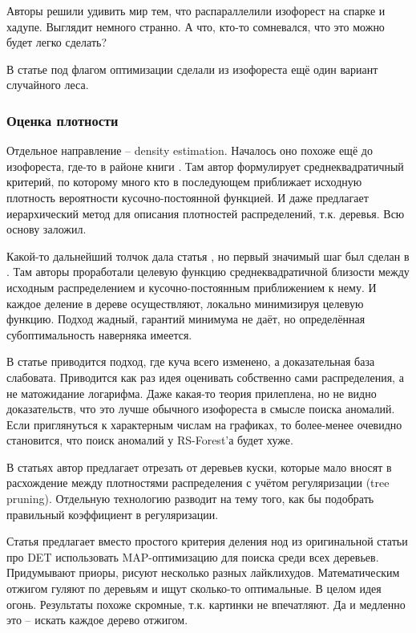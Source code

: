 \documentclass[12pt]{article}
\begin{document}
Авторы
\cite{taoParallelAlgorithmNetwork2018} 
решили удивить мир тем, что распараллелили изофорест на спарке и хадупе. Выглядит немного
странно. А что, кто-то сомневался, что это можно будет легко сделать?

В статье
\cite{liuOptimizedComputationalFramework2018}
под флагом оптимизации сделали из изофореста ещё один вариант случайного леса.

\subsubsection*{Оценка плотности}

Отдельное направление -- density estimation. Началось оно похоже ещё до изофореста, где-то
в районе книги
\cite{silvermanDensityEstimationStatistics1986}
. Там автор формулирует среднеквадратичный критерий, по которому много кто в последующем
приближает исходную плотность вероятности кусочно-постоянной функцией. И даже предлагает
иерархический метод для описания плотностей распределений, т.к. деревья.
Всю основу заложил.

Какой-то дальнейший толчок дала статья
\cite{hookerDiagnosingExtrapolationTreebased2004a}
, но первый значимый шаг был сделан в
\cite{ramDensityEstimationTrees2011}
. Там авторы проработали целевую функцию среднеквадратичной близости
между исходным распределением и кусочно-постоянным приближением к нему. И каждое деление
в дереве осуществляют, локально минимизируя целевую функцию. Подход жадный, гарантий минимума
не даёт, но определённая субоптимальность наверняка имеется.

В статье
\cite{wuRSForestRapidDensity2014}
приводится подход, где куча всего изменено, а доказательная база слабовата.
Приводится как раз идея оценивать собственно сами распределения, а не матожидание
логарифма. Даже какая-то теория прилеплена, но не видно доказательств, что это
лучше обычного изофореста в смысле поиска аномалий. Если приглянуться к характерным
числам на графиках, то более-менее очевидно становится, что поиск аномалий у RS-Forest'а
будет хуже.

В статьях
\cite{anderliniDensityEstimationTrees2015}
\cite{anderliniDensityEstimationTrees2016}
автор предлагает отрезать от деревьев куски, которые мало вносят в расхождение между
плотностями распределения с учётом регуляризации (tree pruning). Отдельную технологию разводит
на тему того, как бы подобрать правильный коэффициент в регуляризации.

Статья
\cite{gohCascadedHighDimensional2016}
предлагает вместо простого критерия деления нод из оригинальной статьи про DET использовать 
MAP-оптимизацию для поиска среди всех деревьев.
Придумывают приоры, рисуют несколько разных лайклихудов. Математическим отжигом гуляют по
деревьям и ищут сколько-то оптимальные. В целом идея огонь. Результаты похоже скромные, т.к.
картинки не впечатляют. Да и медленно это -- искать каждое дерево отжигом.
\end{document}
